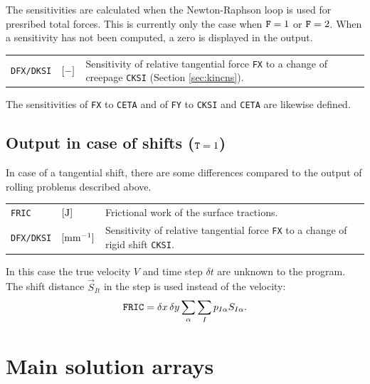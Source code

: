 \documentclass[12pt]{report}
\newenvironment{inputvars}{\vspace{0.4\baselineskip}%

\begin{tabular}{>{\raggedright}p{22mm}p{19mm}p{113mm}}}{
\end{tabular}

}
\newcommand{\inpvar}[3]{{\small\tt #1} & $#2$ & #3 \\[1ex]}
\begin{document}
The sensitivities are calculated when the Newton-Raphson loop is used for
presribed total forces. This is currently only the case when ${\tt F}=1$ or
${\tt F}=2$. When a sensitivity has not been computed, a zero is displayed
in the output.
\begin{inputvars}
\inpvar{DFX/DKSI}{\bunit{-}}{Sensitivity of relative tangential
        force {\tt FX} to a change of creepage {\tt CKSI} (Section
        \ref{sec:kincns}).}
\end{inputvars}
The sensitivities of {\tt FX} to {\tt CETA} and of {\tt FY} to {\tt CKSI}
and {\tt CETA} are likewise defined.

\subsection{\texorpdfstring{Output in case of shifts (${\tt T}=1$)}{Output in case of shifts (T=1)}}

In case of a tangential shift, there are some differences compared to the
output of rolling problems described above.
\begin{inputvars}
\inpvar{FRIC}{\bunit{J}}{Frictional work of the surface tractions.}
\inpvar{DFX/DKSI}{\bunit{mm^{-1}}}{Sensitivity of relative tangential
        force {\tt FX} to a change of rigid shift {\tt CKSI}. }
\end{inputvars}
In this case the true velocity $V$ and time step $\delta t$ are unknown to
the program. The shift distance $\vec{S}_{It}$ in the step is used instead of
the velocity:
\begin{eqnarray}
  {\tt FRIC} = \delta x\,\delta y
                           \sum_\alpha \sum_I p_{I\alpha} S_{I\alpha} .
\end{eqnarray}

\section{Main solution arrays}
\label{sec:solut_arrays}
\end{document}
